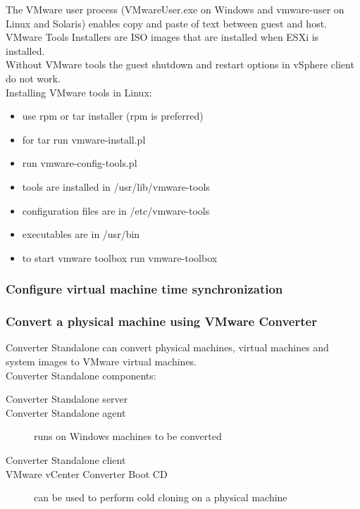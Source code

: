 The VMware user process (VMwareUser.exe on Windows and vmware-user on Linux
and Solaris) enables copy and paste of text between guest and host.\\

VMware Tools Installers are ISO images that are installed when ESXi is
installed.\\

Without VMware tools the guest shutdown and restart options in vSphere client
do not work.\\

Installing VMware tools in Linux:

\begin{itemize}
\item use rpm or tar installer (rpm is preferred)
\item for tar run vmware-install.pl
\item run vmware-config-tools.pl
\item tools are installed in /usr/lib/vmware-tools
\item configuration files are in /etc/vmware-tools
\item executables are in /usr/bin
\item to start vmware toolbox run vmware-toolbox
\end{itemize}

\subsubsection{Configure virtual machine time synchronization}

\subsubsection{Convert a physical machine using VMware Converter}

Converter Standalone can convert physical machines, virtual machines and
system images to VMware virtual machines.\\

Converter Standalone components:

\begin{description}

\item[Converter Standalone server]

\item[Converter Standalone agent]
runs on Windows machines to be converted

\item[Converter Standalone client]

\item[VMware vCenter Converter Boot CD]
can be used to perform cold cloning on a physical machine

\end{description}

